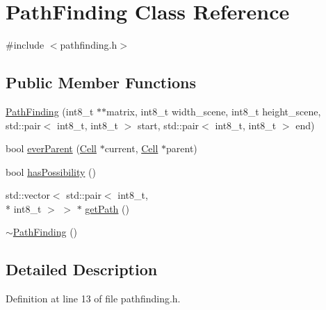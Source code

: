 \hypertarget{class_path_finding}{\section{Path\-Finding Class Reference}
\label{class_path_finding}
}


{\ttfamily \#include $<$pathfinding.\-h$>$}

\subsection*{Public Member Functions}
\begin{DoxyCompactItemize}
\item 
\hyperlink{class_path_finding_a886575c3dc169578626ba9dbf45744be}{Path\-Finding} (int8\-\_\-t $\ast$$\ast$matrix, int8\-\_\-t width\-\_\-scene, int8\-\_\-t height\-\_\-scene, std\-::pair$<$ int8\-\_\-t, int8\-\_\-t $>$ start, std\-::pair$<$ int8\-\_\-t, int8\-\_\-t $>$ end)
\item 
bool \hyperlink{class_path_finding_a3ff60b1cb0a54bfd10dbc75bfce9b47d}{ever\-Parent} (\hyperlink{class_cell}{Cell} $\ast$current, \hyperlink{class_cell}{Cell} $\ast$parent)
\item 
bool \hyperlink{class_path_finding_a8d70d17f06400cdcd5787331d7be38e2}{has\-Possibility} ()
\item 
std\-::vector$<$ std\-::pair$<$ int8\-\_\-t, \\*
int8\-\_\-t $>$ $>$ $\ast$ \hyperlink{class_path_finding_a536055d11c630edc210d100d832a5ccf}{get\-Path} ()
\item 
\hyperlink{class_path_finding_a0fc7389a32fa31a194a940a89f252bdb}{$\sim$\-Path\-Finding} ()
\end{DoxyCompactItemize}


\subsection{Detailed Description}


Definition at line 13 of file pathfinding.\-h.



